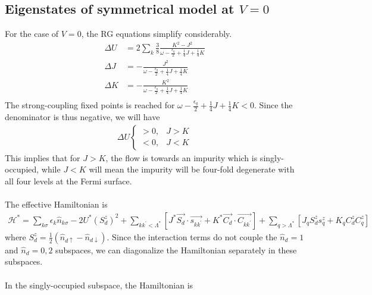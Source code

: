 \documentclass[twoside,11pt]{report}
\numberwithin{equation}{section}
\begin{document}
\subsection{Eigenstates of symmetrical model at \(V=0\)}
For the case of \(V=0\), the RG equations simplify considerably.
\begin{equation}\begin{aligned}
	\Delta U &= 2\sum_k \frac{3}{8}\frac{K^2 - J^2}{\omega - \frac{\epsilon_q}{2} + \frac{1}{4}J + \frac{1}{4}K} \\
	\Delta J &= - \frac{J^2}{\omega - \frac{\epsilon_q}{2} + \frac{1}{4}J + \frac{1}{4}K}\\
	\Delta K &= - \frac{K^2}{\omega - \frac{\epsilon_q}{2} + \frac{1}{4}J + \frac{1}{4}K}\\
\end{aligned}\end{equation}
The strong-coupling fixed points is reached for \(\omega - \frac{\epsilon_q}{2} + \frac{1}{4}J + \frac{1}{4}K < 0\). Since the denominator is thus negative, we will have
\begin{equation}\begin{aligned}
	\Delta U \begin{cases}
		> 0, & J> K \\
		< 0, & J< K
	\end{cases}
\end{aligned}\end{equation}
This implies that for \(J>K\), the flow is towards an impurity which is singly-occupied, while \(J < K\) will mean the impurity will be four-fold degenerate with all four levels at the Fermi surface. 
\\\\The effective Hamiltonian is
\begin{equation}\begin{aligned}
	\mathcal{H}^* = \sum_{k\sigma} \epsilon_k \hat n_{k\sigma} - 2 U^* \left(S_d^z\right)^2 + \sum_{kk^\prime < \Lambda^*}\left[J^* \vec{S_d}\cdot\vec{s_{kk^\prime}} + K^* \vec{C_d}\cdot\vec{C_{kk^\prime}}\right] + \sum_{q > \Lambda^*}\left[J_q S_d^z s^z_{q} + K_q C_d^z C^z_{q}\right]
\end{aligned}\end{equation}
where \(S_d^z = \frac{1}{2}\left( \hat n_{d\uparrow} - \hat n_{d \downarrow} \right) \). Since the interaction terms do not couple the \(\hat n_{d}=1\) and \(\hat n_{d}=0,2\) subspaces, we can diagonalize the Hamiltonian separately in these subspaces. 
\\\\In the singly-occupied subspace, the Hamiltonian is
\end{document}
